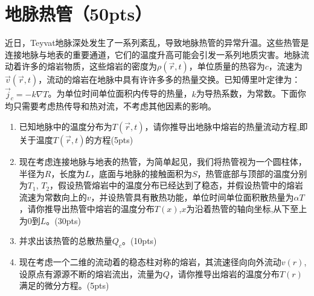 \section{地脉热管（50pts）}
近日，Teyvat地脉深处发生了一系列紊乱，导致地脉热管的异常升温。这些热管是连接地脉与地表的重要通道，它们的温度升高可能会引发一系列地质灾害。地脉流动着许多的熔岩物质，这些熔岩的密度为\(\rho(\vec{r},t)\)，单位质量的热容为\(c\)，流速为\(\vec{v}(\vec{r},t)\)，流动的熔岩在地脉中具有许许多多的热量交换。已知傅里叶定律为：\(\vec{j}_c = -k \nabla T\)。为单位时间单位面积内传导的热量，\(k\)为导热系数，为常数。下面你均只需要考虑热传导和热对流，不考虑其他因素的影响。
\begin{enumerate}
	\item 已知地脉中的温度分布为\(T(\vec{r},t)\)，请你推导出地脉中熔岩的热量流动方程,即关于温度\(T(\vec{r},t)\)的方程(5pts)
	\item 现在考虑连接地脉与地表的热管，为简单起见，我们将热管视为一个圆柱体，半径为\(R\)，长度为\(L\)，底面与地脉的接触面积为\(S\)，热管底部与顶部的温度分别为\(T_1\), \(T_2\)，假设热管熔岩中的温度分布已经达到了稳态，并假设热管中的熔岩流速为常数向上的\(v\)，并设热管具有散热功能，单位时间单位面积散热量为\(\alpha T\)，请你推导出热管中熔岩的温度分布\(T(x)\),\(x\)为沿着热管的轴向坐标,从下至上为\(0\)到\(L\)。(30pts)
	\item 并求出该热管的总散热量\(Q_c\)。(10pts)
	\item 现在考虑一个二维的流动着的稳态柱对称的熔岩，其流速径向向外流动\(v(r)\),设原点有源源不断的熔岩流出，流量为\(Q\)，请你推导出熔岩的温度分布\(T(r)\)满足的微分方程。(5pts)
\end{enumerate}